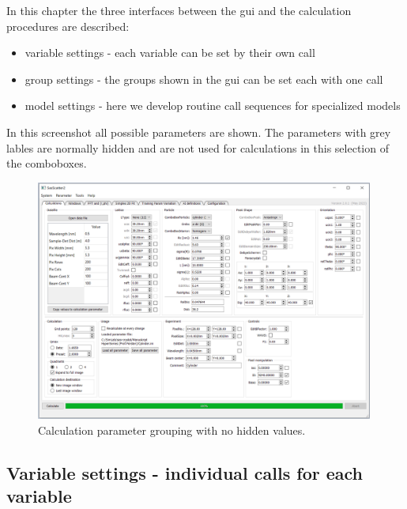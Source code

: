 \documentclass[11pt]{article} %
\begin{document}
In this chapter the three interfaces between the gui and the calculation procedures are described:
\begin{itemize}\itemsep0pt
\item variable settings - each variable can be set by their own call
\item group settings - the groups shown in the gui can be set each with one call
\item model settings - here we develop routine call sequences for specialized models
\end{itemize}
In this screenshot all possible parameters are shown. The parameters with grey lables are normally hidden and are not used for calculations in this selection of the comboboxes.
\begin{figure}[H]
 \centering
 \includegraphics[width=0.99\textwidth]{gui-calculations-nohidden.png}
 \caption{Calculation parameter grouping with no hidden values.}
\end{figure}

\subsection{Variable settings - individual calls for each variable}
\end{document}
